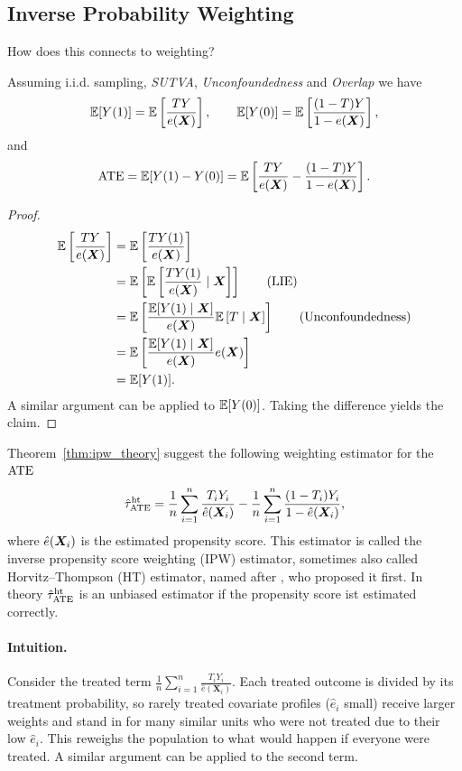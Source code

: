\documentclass[11pt]{exam}
\begin{document}
\subsection{Inverse Probability Weighting}
How does this connects to weighting? 
\begin{theorem}\label{thm:ipw_theory}
    Assuming i.i.d. sampling, \emph{SUTVA}, \emph{Unconfoundedness} and \emph{Overlap} we have
    \[
    \mathbb{E}[Y(1)] = \mathbb{E}\left[\frac{T Y}{e(\bm{X})}\right], \qquad \mathbb{E}[Y(0)] = \mathbb{E}\left[\frac{(1 - T) Y}{1 - e(\bm{X})}\right],
    \]
    and 
    \[
    \mathrm{ATE} = \mathbb{E}[Y(1) - Y(0)] = \mathbb{E}\left[\frac{T Y}{e(\bm{X})} - \frac{(1 - T) Y}{1 - e(\bm{X})}\right].
    \]
\end{theorem}
\begin{proof}
    \begin{align*}
        \mathbb{E}\left[\frac{T Y}{e(\bm{X})}\right] &= \mathbb{E}\left[\frac{T Y(1)}{e(\bm{X})}\right]
        \\
        &= \mathbb{E}\left[\mathbb{E}\left[ \frac{T Y(1)}{e(\bm{X})} \mid \bm{X} \right]\right] \qquad \text{(LIE)}
        \\
        &=  \mathbb{E}\left[\frac{\mathbb{E}[Y(1) \mid \bm{X}]}{e(\bm{X})} \mathbb{E}\left[T\mid \bm{X} \right]\right] \qquad \text{(Unconfoundedness)}
        \\
        &= \mathbb{E}\left[\frac{\mathbb{E}[Y(1) \mid \bm{X}]}{e(\bm{X})}e(\bm{X})\right]
        \\
        &= \mathbb{E}[Y(1)].
    \end{align*}
A similar argument can be applied to $\mathbb{E}[Y(0)]$. Taking the difference yields the claim.
\end{proof}

Theorem~\ref{thm:ipw_theory} suggest the following weighting estimator for the $\mathrm{ATE}$
\[
    \hat \tau_{\mathrm{ATE}}^{\mathrm{ht}} = \frac{1}{n} \sum_{i=1}^n \frac{T_i Y_i}{\hat e(\bm{X}_i)} - \frac{1}{n}\sum_{i=1}^n \frac{(1 - T_i) Y_i}{1 - \hat e(\bm{X}_i)},
\]
where $\hat e(\bm{X}_i)$ is the estimated propensity score. This estimator is called the inverse propensity score weighting (IPW) estimator, sometimes also called Horvitz–Thompson
(HT) estimator, named after \citet{horvitz1952generalization}, who proposed it first. In theory $\hat \tau_{\mathrm{ATE}}^{\mathrm{ht}}$ is an unbiased estimator if the propensity score ist estimated correctly.

\paragraph{Intuition.}
Consider the treated term $\frac{1}{n}\sum_{i=1}^n \frac{T_i Y_i}{\hat e(\mathbf{X}_i)}$.
Each treated outcome is divided by its treatment probability, so rarely treated covariate profiles ($\hat e_i$ small) receive larger weights and stand in for many similar units who were not treated due to their low $\hat e_i$. This reweighs the population to what would happen if everyone were treated. A similar argument can be applied to the second term.
\end{document}
